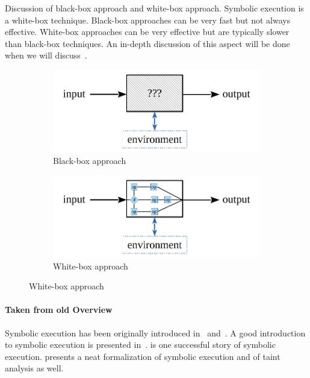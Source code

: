 Discussion of black-box approach and white-box approach. Symbolic execution is a white-box technique. Black-box approaches can be very fast but not always effective. White-box approaches can be very effective but are typically slower than black-box techniques. An in-depth discussion of this aspect will be done when we will discuss~\cite{DRILLER-NDSS16}.

\begin{figure}[H]
  \vspace{-3mm}
  \centering
  \begin{subfigure}{.5\textwidth}
    \centering
    \includegraphics[width=0.9\linewidth]{images/blackbox} 
    \caption{Black-box approach}
  \end{subfigure}%
  \begin{subfigure}{.5\textwidth}
    \centering
    \includegraphics[width=0.9\linewidth]{images/whitebox} 
    \caption{White-box approach}
  \end{subfigure}
  \vspace{-3mm}
\end{figure}

\paragraph{Taken from old Overview}

Symbolic execution has been originally introduced in~\cite{K-CACM76} and~\cite{H-TSE77}. A good introduction to symbolic execution is presented in~\cite{KLEE-OSDI08}.
\cite{SAGE-NDSS08} is one successful story of symbolic execution. \cite{SAB-SP10} presents a neat formalization of symbolic execution and of taint analysis as well.

